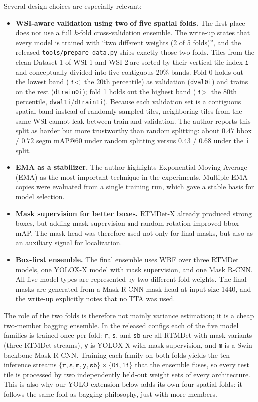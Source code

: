 \documentclass[12pt, a4paper]{article}
\begin{document}
Several design choices are especially relevant:
\begin{itemize}
    \item \textbf{WSI-aware validation using two of five spatial folds.} The first place does not use a full $k$-fold cross-validation ensemble. The write-up states that every model is trained with ``two different weights (2 of 5 folds)'', and the released \texttt{tools/\allowbreak prepare\_\allowbreak data.py} ships exactly those two folds. Tiles from the clean Dataset 1 of WSI 1 and WSI 2 are sorted by their vertical tile index \texttt{i} and conceptually divided into five contiguous 20\% bands. Fold 0 holds out the lowest band ($\texttt{i}<$ the 20th percentile) as validation (\texttt{dval0i}) and trains on the rest (\texttt{dtrain0i}); fold 1 holds out the highest band ($\texttt{i}>$ the 80th percentile, \texttt{dval1i}/\texttt{dtrain1i}). Because each validation set is a contiguous spatial band instead of randomly sampled tiles, neighboring tiles from the same WSI cannot leak between train and validation. The author reports this split as harder but more trustworthy than random splitting: about $0.47$ bbox / $0.72$ segm mAP@60 under random splitting versus $0.43$ / $0.68$ under the \texttt{i} split.
    \item \textbf{EMA as a stabilizer.} The author highlights Exponential Moving Average (EMA) as the most important technique in the experiments. Multiple EMA copies were evaluated from a single training run, which gave a stable basis for model selection.
    \item \textbf{Mask supervision for better boxes.} RTMDet-X already produced strong boxes, but adding mask supervision and random rotation improved bbox mAP. The mask head was therefore used not only for final masks, but also as an auxiliary signal for localization.
    \item \textbf{Box-first ensemble.} The final ensemble uses WBF over three RTMDet models, one YOLOX-X model with mask supervision, and one Mask R-CNN. All five model types are represented by two different fold weights. The final masks are generated from a Mask R-CNN mask head at input size 1440, and the write-up explicitly notes that no TTA was used.
\end{itemize}

The role of the two folds is therefore not mainly variance estimation; it is a cheap two-member bagging ensemble. In the released configs each of the five model families is trained once per fold: \texttt{r}, \texttt{s}, and \texttt{sb} are all RTMDet-with-mask variants (three RTMDet streams), \texttt{y} is YOLOX-X with mask supervision, and \texttt{m} is a Swin-backbone Mask R-CNN. Training each family on both folds yields the ten inference streams $\{\texttt{r},\texttt{s},\texttt{m},\texttt{y},\texttt{sb}\}\times\{\texttt{0i},\texttt{1i}\}$ that the ensemble fuses, so every test tile is processed by two independently held-out weight sets of every architecture. This is also why our YOLO extension below adds its own four spatial folds: it follows the same fold-as-bagging philosophy, just with more members.
\end{document}
